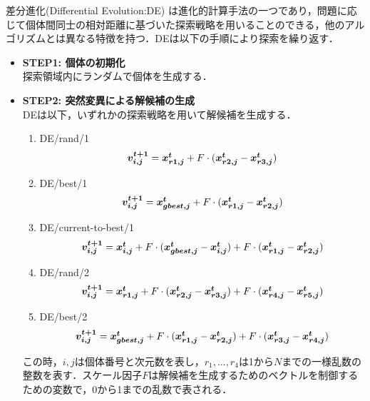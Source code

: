 \documentclass[a4j,11pt]{jarticle}
\begin{document}
差分進化(Differential Evolution:DE) \cite{DE} は進化的計算手法の一つであり，問題に応じて個体間同士の相対距離に基づいた探索戦略を用いることのできる，他のアルゴリズムとは異なる特徴を持つ．DEは以下の手順により探索を繰り返す．
\begin{itemize}
\item {\bf STEP1: 個体の初期化} \\
探索領域内にランダムで個体を生成する．
\item {\bf STEP2: 突然変異による解候補の生成} \\
DEは以下，いずれかの探索戦略を用いて解候補を生成する．
\begin{enumerate}
\item{DE/rand/1}
\begin{equation}
\label{eq:rand1}
\mbox{\boldmath $v_{i,j}^{t+1}$}=\mbox{\boldmath $x_{r1,j}^t$}+F \cdot (\mbox{\boldmath $x_{r2,j}^t$}-\mbox{\boldmath $x_{r3,j}^t$})
\end{equation}
\item{DE/best/1}
\begin{equation}
\label{eq:best1}
\mbox{\boldmath $v_{i,j}^{t+1}$}=\mbox{\boldmath $x_{gbest,j}^t$}+F \cdot (\mbox{\boldmath $x_{r1,j}^t$}-\mbox{\boldmath $x_{r2,j}^t$})
\end{equation}
\item{DE/current-to-best/1}
\begin{equation}
\label{eq:cur2best1}
\mbox{\boldmath $v_{i,j}^{t+1}$}=\mbox{\boldmath $x_{i,j}^t$}+F \cdot (\mbox{\boldmath $x_{gbest,j}^t$}-\mbox{\boldmath $x_{i,j}^t$})+F \cdot (\mbox{\boldmath $x_{r1,j}^t$}-\mbox{\boldmath $x_{r2,j}^t$})
\end{equation}
\item{DE/rand/2}
\begin{equation}
\label{eq:rand2}
\mbox{\boldmath $v_{i,j}^{t+1}$}=\mbox{\boldmath $x_{r1,j}^t$}+F \cdot (\mbox{\boldmath $x_{r2,j}^t$}-\mbox{\boldmath $x_{r3,j}^t$})+F\cdot (\mbox{\boldmath $x_{r4,j}^t$}-\mbox{\boldmath $x_{r5,j}^t$})
\end{equation}
\item{DE/best/2}
\begin{equation}
\label{eq:best2}
\mbox{\boldmath $v_{i,j}^{t+1}$}=\mbox{\boldmath $x_{gbest,j}^t$}+F \cdot (\mbox{\boldmath $x_{r1,j}^t$}-\mbox{\boldmath $x_{r2,j}^t$})+F \cdot (\mbox{\boldmath $x_{r3,j}^t$}-\mbox{\boldmath $x_{r4,j}^t$})
\end{equation}
\end{enumerate}
この時，$i,j$は個体番号と次元数を表し，$r_1,...,r_4$は1から$N$までの一様乱数の整数を表す．スケール因子$F$は解候補を生成するためのベクトルを制御するための変数で，0から1までの乱数で表される．

\end{itemize}
\end{document}
